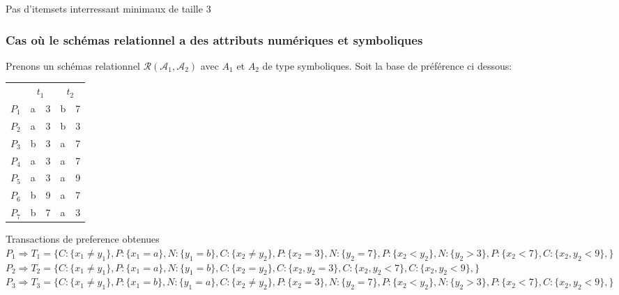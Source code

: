 \documentclass[a4paper,12pt,openany,oneside]{article}
\begin{document}
        
        Pas d'itemsets interressant minimaux de taille 3\\
        
        
        
        \subsubsection{Cas où le schémas relationnel a des attributs numériques et symboliques}
        	Prenons un schémas relationnel $\mathcal{R}(\mathcal{A}_{1},\mathcal{A}_{2})$ avec $A_{1}$ et $A_{2}$ de type symboliques. Soit la base de préférence ci dessous:
        	\begin{center}
        	\begin{tabular}{l|l|l|l|l| } 
        	
        	&\multicolumn{2}{c|}{$t_{1}$} & \multicolumn{2}{c|}{$t_{2}$}\\
        	\cline{2-5}
        		$P_{1}$ & a & 3 & b & 7\\
        		$P_{2}$ & a & 3 & b & 3\\		
        		$P_{3}$ & b & 3 & a & 7\\
        		$P_{4}$ & a & 3 & a & 7\\
        		$P_{5}$ & a & 3 & a & 9\\
        		$P_{6}$ & b & 9 & a & 7\\
        		$P_{7}$ & b & 7 & a & 3\\
        	\cline{2-5}
        	\end{tabular}
        	\end{center}
        
        
        Transactions de preference obtenues\\
        
        \noindent $P_{1}\Rightarrow T_{1}=\{C:\{x_{1}\neq y_{1}\},P:\{x_{1}=a\},N:\{y_{1}=b\},C:\{x_{2}\neq y_{2}\},P:\{x_{2}=3\},N:\{y_{2}=7\},P:\{x_{2}<y_{2}\},N:\{y_{2}>3\},P:\{x_{2}<7\},C:\{x_{2},y_{2}<9\},\}$ \\
        
        \noindent $P_{2}\Rightarrow T_{2}=\{C:\{x_{1}\neq y_{1}\},P:\{x_{1}=a\},N:\{y_{1}=b\},C:\{x_{2}=y_{2}\},C:\{x_{2},y_{2}=3\},C:\{x_{2},y_{2}<7\},C:\{x_{2},y_{2}<9\},\}$ \\
        
        \noindent $P_{3}\Rightarrow T_{3}=\{C:\{x_{1}\neq y_{1}\},P:\{x_{1}=b\},N:\{y_{1}=a\},C:\{x_{2}\neq y_{2}\},P:\{x_{2}=3\},N:\{y_{2}=7\},P:\{x_{2}<y_{2}\},N:\{y_{2}>3\},P:\{x_{2}<7\},C:\{x_{2},y_{2}<9\},\}$ \\
        
\end{document}
